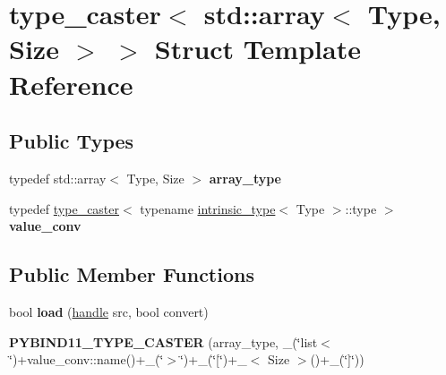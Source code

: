 \hypertarget{structtype__caster_3_01std_1_1array_3_01_type_00_01_size_01_4_01_4}{}\section{type\+\_\+caster$<$ std\+:\+:array$<$ Type, Size $>$ $>$ Struct Template Reference}
\label{structtype__caster_3_01std_1_1array_3_01_type_00_01_size_01_4_01_4}
\subsection*{Public Types}
\begin{DoxyCompactItemize}
\item 
typedef std\+::array$<$ Type, Size $>$ {\bfseries array\+\_\+type}\hypertarget{structtype__caster_3_01std_1_1array_3_01_type_00_01_size_01_4_01_4_af82a547f9ca4b581dc1dca34bc79c691}{}\label{structtype__caster_3_01std_1_1array_3_01_type_00_01_size_01_4_01_4_af82a547f9ca4b581dc1dca34bc79c691}

\item 
typedef \hyperlink{classtype__caster}{type\+\_\+caster}$<$ typename \hyperlink{structintrinsic__type}{intrinsic\+\_\+type}$<$ Type $>$\+::type $>$ {\bfseries value\+\_\+conv}\hypertarget{structtype__caster_3_01std_1_1array_3_01_type_00_01_size_01_4_01_4_a65aa7eb48f553991a98d0569647c0b02}{}\label{structtype__caster_3_01std_1_1array_3_01_type_00_01_size_01_4_01_4_a65aa7eb48f553991a98d0569647c0b02}

\end{DoxyCompactItemize}
\subsection*{Public Member Functions}
\begin{DoxyCompactItemize}
\item 
bool {\bfseries load} (\hyperlink{classhandle}{handle} src, bool convert)\hypertarget{structtype__caster_3_01std_1_1array_3_01_type_00_01_size_01_4_01_4_abf28e1df8032e52e76dbea4e7db7c220}{}\label{structtype__caster_3_01std_1_1array_3_01_type_00_01_size_01_4_01_4_abf28e1df8032e52e76dbea4e7db7c220}

\item 
{\bfseries P\+Y\+B\+I\+N\+D11\+\_\+\+T\+Y\+P\+E\+\_\+\+C\+A\+S\+T\+ER} (array\+\_\+type, \+\_\+(\char`\"{}list$<$\char`\"{})+value\+\_\+conv\+::name()+\+\_\+(\char`\"{}$>$\char`\"{})+\+\_\+(\char`\"{}\mbox{[}\char`\"{})+\+\_\+$<$ Size $>$()+\+\_\+(\char`\"{}\mbox{]}\char`\"{}))\hypertarget{structtype__caster_3_01std_1_1array_3_01_type_00_01_size_01_4_01_4_ae6148cb30a84963afc6b25f180585f0a}{}\label{structtype__caster_3_01std_1_1array_3_01_type_00_01_size_01_4_01_4_ae6148cb30a84963afc6b25f180585f0a}

\end{DoxyCompactItemize}
